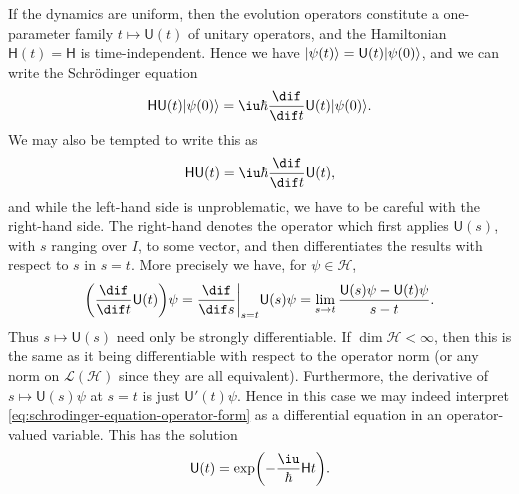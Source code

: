 \documentclass[article, a4paper, 11pt, oneside]{memoir}
\numberwithin{equation}{chapter}
\newcommand{\calL}{\mathcal{L}}
\newcommand{\calH}{\mathcal{H}}
\DeclarePairedDelimiter{\ket}{\lvert}{\rangle}
\newcommand{\op}[1]{\mathsf{#1}}
\begin{document}
If the dynamics are uniform, then the evolution operators constitute a one-parameter family $t \mapsto \op{U}(t)$ of unitary operators, and the Hamiltonian $\op{H}(t) = \op{H}$ is time-independent. Hence we have $\ket{\psi(t)} = \op{U}(t) \ket{\psi(0)}$, and we can write the Schrödinger equation
%
\begin{equation*}
    \op{H} \op{U}(t) \ket{\psi(0)}
        = \iu \hbar \frac{\dif}{\dif t} \op{U}(t) \ket{\psi(0)}.
\end{equation*}
%
We may also be tempted to write this as
%
\begin{equation}
    \label{eq:schrodinger-equation-operator-form}
    \op{H} \op{U}(t)
        = \iu \hbar \frac{\dif}{\dif t} \op{U}(t),
\end{equation}
%
and while the left-hand side is unproblematic, we have to be careful with the right-hand side. The right-hand denotes the operator which first applies $\op{U}(s)$, with $s$ ranging over $I$, to some vector, and then differentiates the results with respect to $s$ in $s = t$. More precisely we have, for $\psi \in \calH$,
%
\begin{equation*}
    \biggl( \frac{\dif}{\dif t} \op{U}(t) \biggr) \psi
        = \frac{\dif}{\dif s} \bigg\vert_{s=t} \op{U}(s) \psi
        = \lim_{s \to t} \frac{\op{U}(s)\psi - \op{U}(t)\psi}{s-t}.
\end{equation*}
%
Thus $s \mapsto \op{U}(s)$ need only be strongly differentiable. If $\dim\calH < \infty$, then this is the same as it being differentiable with respect to the operator norm (or any norm on $\calL(\calH)$ since they are all equivalent). Furthermore, the derivative of $s \mapsto \op{U}(s)\psi$ at $s = t$ is just $\op{U}'(t)\psi$. Hence in this case we may indeed interpret \cref{eq:schrodinger-equation-operator-form} as a differential equation in an operator-valued variable. This has the solution
%
\begin{equation*}
    \op{U}(t)
        = \exp \biggl( - \frac{\iu}{\hbar} \op{H} t \biggr).
\end{equation*}
\end{document}
